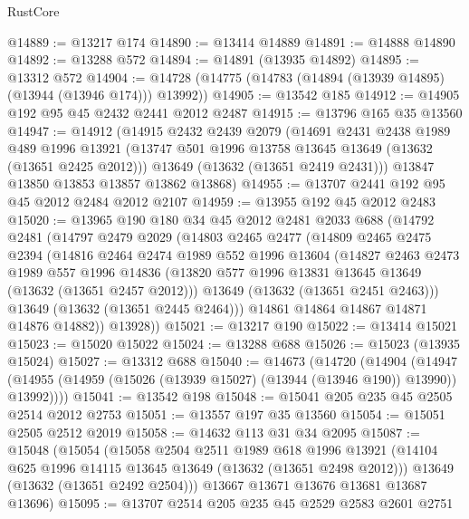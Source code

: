 \begin{lexlean}{RustCore}
\begin{coremodule}
@14889 := @13217 @174
@14890 := @13414 @14889
@14891 := @14888 @14890
@14892 := @13288 @572
@14894 := @14891 (@13935 @14892)
@14895 := @13312 @572
@14904 := @14728 (@14775 (@14783 (@14894 (@13939 @14895) (@13944 (@13946 @174))) @13992))
@14905 := @13542 @185
@14912 := @14905 @192 @95 @45 @2432 @2441 @2012 @2487
@14915 := @13796 @165 @35 @13560
@14947 := @14912
    (@14915
      @2432
      @2439
      @2079
      (@14691
        @2431
        @2438
        @1989
        @489
        @1996
        @13921
        (@13747 @501 @1996 @13758 @13645 @13649 (@13632 (@13651 @2425 @2012)))
        @13649
        (@13632 (@13651 @2419 @2431)))
      @13847
      @13850
      @13853
      @13857
      @13862
      @13868)
@14955 := @13707 @2441 @192 @95 @45 @2012 @2484 @2012 @2107
@14959 := @13955 @192 @45 @2012 @2483
@15020 := @13965
    @190
    @180
    @34
    @45
    @2012
    @2481
    @2033
    @688
    (@14792
      @2481
      (@14797
        @2479
        @2029
        (@14803
          @2465
          @2477
          (@14809
            @2465
            @2475
            @2394
            (@14816
              @2464
              @2474
              @1989
              @552
              @1996
              @13604
              (@14827
                @2463
                @2473
                @1989
                @557
                @1996
                @14836
                (@13820 @577 @1996 @13831 @13645 @13649 (@13632 (@13651 @2457 @2012)))
                @13649
                (@13632 (@13651 @2451 @2463)))
              @13649
              (@13632 (@13651 @2445 @2464)))
            @14861
            @14864
            @14867
            @14871
            @14876
            @14882))
        @13928))
@15021 := @13217 @190
@15022 := @13414 @15021
@15023 := @15020 @15022
@15024 := @13288 @688
@15026 := @15023 (@13935 @15024)
@15027 := @13312 @688
@15040 := @14673
    (@14720
      (@14904
        (@14947 (@14955 (@14959 (@15026 (@13939 @15027) (@13944 (@13946 @190)) @13990)) @13992))))
@15041 := @13542 @198
@15048 := @15041 @205 @235 @45 @2505 @2514 @2012 @2753
@15051 := @13557 @197 @35 @13560
@15054 := @15051 @2505 @2512 @2019
@15058 := @14632 @113 @31 @34 @2095
@15087 := @15048
    (@15054
      (@15058
        @2504
        @2511
        @1989
        @618
        @1996
        @13921
        (@14104 @625 @1996 @14115 @13645 @13649 (@13632 (@13651 @2498 @2012)))
        @13649
        (@13632 (@13651 @2492 @2504)))
      @13667
      @13671
      @13676
      @13681
      @13687
      @13696)
@15095 := @13707 @2514 @205 @235 @45 @2529 @2583 @2601 @2751

\end{coremodule}
\end{lexlean}
